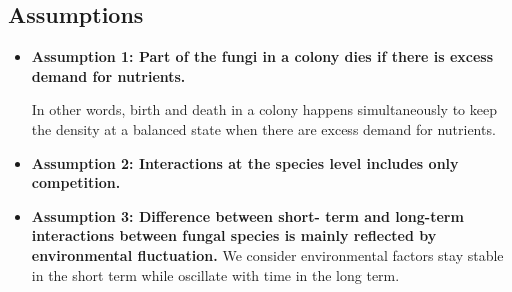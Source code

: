 \documentclass[12pt]{article}
\begin{document}
\subsection{Assumptions}
\begin{itemize}
	\item \textbf{Assumption 1: Part of the fungi in a colony dies if there is excess demand for nutrients.}
	
	In other words, birth and death in a colony happens simultaneously to keep the density at a balanced state when there are excess demand for nutrients.
	\item \textbf{Assumption 2: Interactions at the species level includes only competition.} 
	\item \textbf{Assumption 3: Difference between short- term and long-term interactions between fungal species is mainly reflected by environmental fluctuation.} 
	We consider environmental factors stay stable in the short term while oscillate with time in the long term.
\end{itemize}
\end{document}
